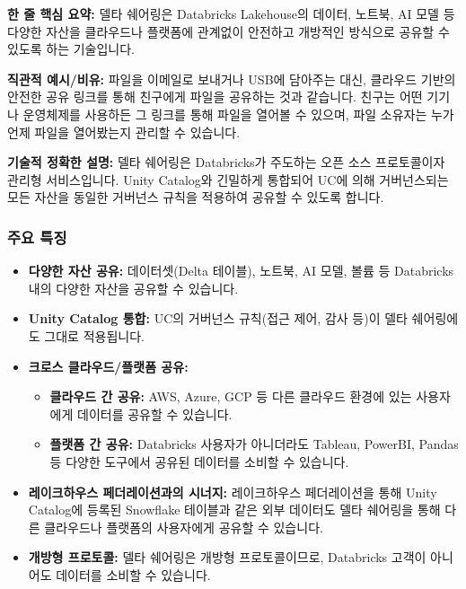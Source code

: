 \documentclass[11pt,a4paper]{article}
\theoremstyle{definition}
\begin{document}
\begin{keyconceptbox}
\textbf{한 줄 핵심 요약:} 델타 쉐어링은 Databricks Lakehouse의 데이터, 노트북, AI 모델 등 다양한 자산을 클라우드나 플랫폼에 관계없이 안전하고 개방적인 방식으로 공유할 수 있도록 하는 기술입니다.
\end{keyconceptbox}

\textbf{직관적 예시/비유:}
파일을 이메일로 보내거나 USB에 담아주는 대신, 클라우드 기반의 안전한 공유 링크를 통해 친구에게 파일을 공유하는 것과 같습니다. 친구는 어떤 기기나 운영체제를 사용하든 그 링크를 통해 파일을 열어볼 수 있으며, 파일 소유자는 누가 언제 파일을 열어봤는지 관리할 수 있습니다.

\textbf{기술적 정확한 설명:}
델타 쉐어링은 Databricks가 주도하는 오픈 소스 프로토콜이자 관리형 서비스입니다. Unity Catalog와 긴밀하게 통합되어 UC에 의해 거버넌스되는 모든 자산을 동일한 거버넌스 규칙을 적용하여 공유할 수 있도록 합니다.

\subsubsection*{주요 특징}
\begin{itemize}
    \item \textbf{다양한 자산 공유:} 데이터셋(Delta 테이블), 노트북, AI 모델, 볼륨 등 Databricks 내의 다양한 자산을 공유할 수 있습니다.
    \item \textbf{Unity Catalog 통합:} UC의 거버넌스 규칙(접근 제어, 감사 등)이 델타 쉐어링에도 그대로 적용됩니다.
    \item \textbf{크로스 클라우드/플랫폼 공유:}
    \begin{itemize}
        \item \textbf{클라우드 간 공유:} AWS, Azure, GCP 등 다른 클라우드 환경에 있는 사용자에게 데이터를 공유할 수 있습니다.
        \item \textbf{플랫폼 간 공유:} Databricks 사용자가 아니더라도 Tableau, PowerBI, Pandas 등 다양한 도구에서 공유된 데이터를 소비할 수 있습니다.
    \end{itemize}
    \item \textbf{레이크하우스 페더레이션과의 시너지:} 레이크하우스 페더레이션을 통해 Unity Catalog에 등록된 Snowflake 테이블과 같은 외부 데이터도 델타 쉐어링을 통해 다른 클라우드나 플랫폼의 사용자에게 공유할 수 있습니다.
    \item \textbf{개방형 프로토콜:} 델타 쉐어링은 개방형 프로토콜이므로, Databricks 고객이 아니어도 데이터를 소비할 수 있습니다.
\end{itemize}
\end{document}
